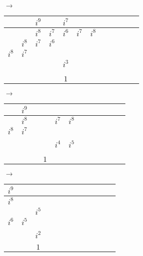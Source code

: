 \documentclass[12pt]{article}
\begin{document}
\begin{center}
$\longrightarrow$
\begin{tabular}{|l|c|c|c|c|c|c|c|c|c|c|r|}
    \hline
    & & $i^9$ & & $i^7$ & & \\
    \hline
    & & $i^8$ & $i^7$ & $i^6$ & $i^7$ & $i^8$\\
    \hline
    & $i^8$ & $i^7$ & $i^6$ & & &\\
    \hline
    $i^8$ & $i^7$ & & & \color{red}{$i^4$} & &\\
    \hline
    & & & & $i^3$ & \color{red}{$i^4$} & \color{red}{$i^5$} \\
    \hline
    & & & & & & \\
    \hline
    & & & & & & \\
    \hline
    & & & & $1$ & & \\
    \hline
\end{tabular}
$\longrightarrow$
\begin{tabular}{|l|c|c|c|c|c|c|c|c|c|c|r|}
    \hline
    & $i^9$ & & & & \\
    \hline
    & $i^8$ & & & $i^7$ & $i^8$\\
    \hline
    $i^8$ & $i^7$ & & \color{red}{$i^5$} & &\\
    \hline
    & \color{red}{$i^6$} & \color{red}{$i^5$} & & &\\
    \hline
    & & & & $i^4$ & $i^5$ \\
    \hline
    & & & \color{red}{$i^2$} & & \\
    \hline
    & & & & & \\
    \hline
    & & & $1$ & & \\
    \hline
\end{tabular}
$\longrightarrow$
\begin{tabular}{|l|c|c|c|c|c|c|c|c|c|c|r|}
    \hline
    $i^9$ & &\\
    \hline
    $i^8$ & & \color{red}{$i^6$}\\
    \hline
    & \color{red}{$i^6$} & $i^5$\\
    \hline
    $i^6$ & $i^5$ &\\
    \hline
    & & \color{red}{$i^3$}\\
    \hline
    & & $i^2$\\
    \hline
    & &\\
    \hline
    & & $1$\\
    \hline
\end{tabular}


\end{center}
\end{document}
